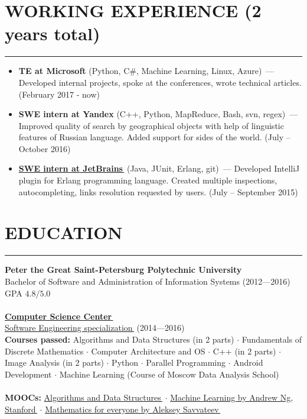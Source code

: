 \documentclass[11pt]{res} %
\let\orighref\href
\renewcommand{\href}[2]{\orighref{#1}{#2\,\faExternalLink}}
\begin{document}
\begin{resume}
\section{\uppercase{Working Experience} (2 years total)}
\begin{spacing}{0.3}
\textcolor[RGB]{220,220,220}{\rule{\linewidth}{0.4pt}} 
\end{spacing}
\vspace{0.2in}
   \begin{itemize} \itemsep -2pt  %
   \item {\textbf{TE at Microsoft}} (Python, C\#, Machine Learning, Linux, Azure)~--- Developed internal projects, spoke at the conferences, wrote technical articles. (February 2017 - now)
   \item {\textbf{SWE intern at Yandex}} (C++, Python, MapReduce, Bash, svn, regex)~--- Improved quality of search by geographical objects with help of linguistic features of Russian language. Added support for sides of the world. (July – October 2016)
   \item \textbf{\href{https://github.com/ignatov/intellij-erlang/commits?author=telezhnaya}{SWE intern at JetBrains}} (Java, JUnit, Erlang, git)~--- Developed IntelliJ plugin for Erlang programming language. Created multiple inspections, autocompleting, links resolution requested by users. (July – September 2015)
 \end{itemize}

\section{\uppercase{Education}} 
\begin{spacing}{0.3}
\textcolor[RGB]{220,220,220}{\rule{\linewidth}{0.4pt}} 
\end{spacing}
\noindent \textbf{Peter the Great Saint-Petersburg Polytechnic University} \\
Bachelor of Software and Administration of Information Systems (2012---2016) \\
GPA $4.8/5.0$ \\ \\ 
\textbf{\href{https://compscicenter.ru/about/}{Computer Science Center}} \\
\href{https://compscicenter.ru/users/801/}{Software Engineering specialization} (2014---2016) \\
\textbf{Courses passed:} Algorithms and Data Structures (in 2 parts) $\cdot$ Fundamentals of Discrete Mathematics $\cdot$ Computer Architecture and OS $\cdot$ C++ (in 2 parts) $\cdot$ Image Analysis (in 2 parts) $\cdot$ Python $\cdot$ Parallel Programming $\cdot$ Android Development $\cdot$ Machine Learning (Course of Moscow Data Analysis School) \\ \\ 
\noindent \textbf{MOOCs:} \href{https://stepik.org/certificate/c97c48eb77cd3edbf2b4cb8d1624930ffe87cb7c.pdf}{Algorithms and Data Structures} $\cdot$ \href{https://www.coursera.org/learn/machine-learning}{Machine Learning by Andrew Ng, Stanford} $\cdot$ \href{https://www.coursera.org/learn/matematika-dlya-vseh}{Mathematics for everyone by Aleksey Savvateev}


\end{resume}
\end{document}
